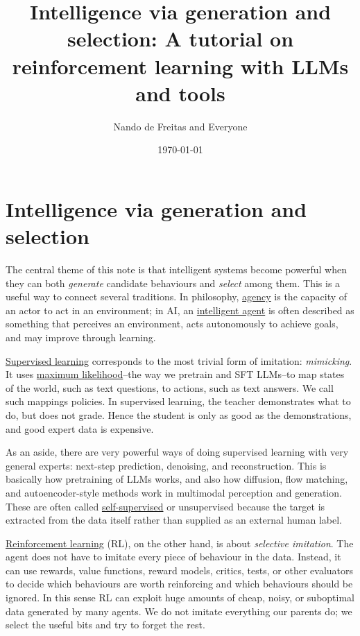 \documentclass{article}
\title{Intelligence via generation and selection: A tutorial on reinforcement learning with LLMs and tools}
\author{Nando de Freitas and Everyone}
\date{\today}
\begin{document}
\maketitle


\section{Intelligence via generation and selection}

The central theme of this note is that intelligent systems become powerful when they can both \emph{generate} candidate behaviours and \emph{select} among them. This is a useful way to connect several traditions. In philosophy, \href{https://en.wikipedia.org/wiki/Agency_(philosophy)}{agency} is the capacity of an actor to act in an environment; in AI, an \href{https://en.wikipedia.org/wiki/Intelligent_agent}{intelligent agent} is often described as something that perceives an environment, acts autonomously to achieve goals, and may improve through learning.

\href{https://en.wikipedia.org/wiki/Supervised_learning}{Supervised learning} corresponds to the most trivial form of imitation: \emph{mimicking}. It uses \href{https://en.wikipedia.org/wiki/Maximum_likelihood_estimation}{maximum likelihood}--the way we pretrain and SFT LLMs--to map states of the world, such as text questions, to actions, such as text answers. We call such mappings policies. In supervised learning, the teacher demonstrates what to do, but does not grade. Hence the student is only as good as the demonstrations, and good expert data is expensive.

As an aside, there are very powerful ways of doing supervised learning with very general experts: next-step prediction, denoising, and reconstruction. This is basically how pretraining of LLMs works, and also how diffusion, flow matching, and autoencoder-style methods work in multimodal perception and generation. These are often called \href{https://en.wikipedia.org/wiki/Self-supervised_learning}{self-supervised} or unsupervised because the target is extracted from the data itself rather than supplied as an external human label.

\href{https://en.wikipedia.org/wiki/Reinforcement_learning}{Reinforcement learning} (RL), on the other hand, is about \emph{selective imitation}. The agent does not have to imitate every piece of behaviour in the data. Instead, it can use rewards, value functions, reward models, critics, tests, or other evaluators to decide which behaviours are worth reinforcing and which behaviours should be ignored. In this sense RL can exploit huge amounts of cheap, noisy, or suboptimal data generated by many agents. We do not imitate everything our parents do; we select the useful bits and try to forget the rest.
\end{document}
